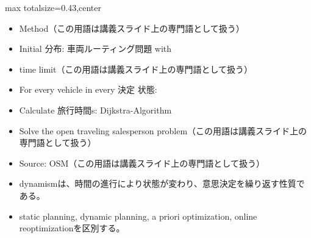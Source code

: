 \clearpage
{}
\begin{minipage}[t]{0.405\textwidth}
\begin{adjustbox}{max totalsize={\textwidth}{0.43\textheight},center}
\begin{minipage}{\textwidth}\scriptsize
{}\begin{itemize}
\item Method（この用語は講義スライド上の専門語として扱う）
\item Initial 分布: 車両ルーティング問題 with
\item time limit（この用語は講義スライド上の専門語として扱う）
\item For every vehicle in every 決定 状態:
\item Calculate 旅行時間s: Dijkstra-Algorithm
\item Solve the open traveling salesperson problem（この用語は講義スライド上の専門語として扱う）
\item Source: OSM（この用語は講義スライド上の専門語として扱う）
\end{itemize}\begin{itemize}
\item dynamismは、時間の進行により状態が変わり、意思決定を繰り返す性質である。
\item static planning, dynamic planning, a priori optimization, online reoptimizationを区別する。
\end{itemize}
\end{minipage}
\end{adjustbox}
\end{minipage}\hfill
